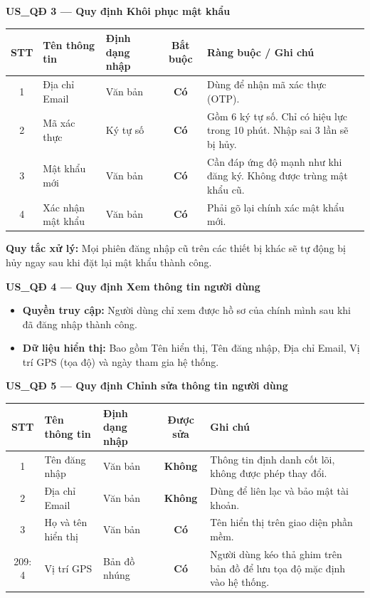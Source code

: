 \documentclass[12pt,a4paper]{article}
\begin{document}
\vspace{0.4cm}
\noindent\textbf{US\_QĐ 3 --- Quy định Khôi phục mật khẩu}
\begin{longtable}{|c|l|p{2.5cm}|c|p{5cm}|}
\hline
\rowcolor{headerblue}
\textbf{STT} & \textbf{Tên thông tin} & \textbf{Định dạng nhập} & \textbf{Bắt buộc} & \textbf{Ràng buộc / Ghi chú} \\
\hline
\endhead
1 & Địa chỉ Email & Văn bản & \textbf{Có} & Dùng để nhận mã xác thực (OTP). \\
\hline
2 & Mã xác thực & Ký tự số & \textbf{Có} & Gồm 6 ký tự số. Chỉ có hiệu lực trong 10 phút. Nhập sai 3 lần sẽ bị hủy. \\
\hline
3 & Mật khẩu mới & Văn bản & \textbf{Có} & Cần đáp ứng độ mạnh như khi đăng ký. Không được trùng mật khẩu cũ. \\
\hline
4 & Xác nhận mật khẩu & Văn bản & \textbf{Có} & Phải gõ lại chính xác mật khẩu mới. \\
\hline
\end{longtable}
\noindent\textbf{Quy tắc xử lý:} Mọi phiên đăng nhập cũ trên các thiết bị khác sẽ tự động bị hủy ngay sau khi đặt lại mật khẩu thành công.

\vspace{0.4cm}
\noindent\textbf{US\_QĐ 4 --- Quy định Xem thông tin người dùng}
\begin{itemize}
    \item \textbf{Quyền truy cập:} Người dùng chỉ xem được hồ sơ của chính mình sau khi đã đăng nhập thành công.
    \item \textbf{Dữ liệu hiển thị:} Bao gồm Tên hiển thị, Tên đăng nhập, Địa chỉ Email, Vị trí GPS (tọa độ) và ngày tham gia hệ thống.
\end{itemize}

\vspace{0.4cm}
\noindent\textbf{US\_QĐ 5 --- Quy định Chỉnh sửa thông tin người dùng}
\begin{longtable}{|c|l|p{2.5cm}|c|p{5cm}|}
\hline
\rowcolor{headerblue}
\textbf{STT} & \textbf{Tên thông tin} & \textbf{Định dạng nhập} & \textbf{Được sửa} & \textbf{Ghi chú} \\
\hline
\endhead
1 & Tên đăng nhập & Văn bản & \textbf{Không} & Thông tin định danh cốt lõi, không được phép thay đổi. \\
\hline
2 & Địa chỉ Email & Văn bản & \textbf{Không} & Dùng để liên lạc và bảo mật tài khoản. \\
\hline
3 & Họ và tên hiển thị & Văn bản & \textbf{Có} & Tên hiển thị trên giao diện phần mềm. \\
\hline
209: 4 & Vị trí GPS & Bản đồ nhúng & \textbf{Có} & Người dùng kéo thả ghim trên bản đồ để lưu tọa độ mặc định vào hệ thống. \\
\hline
\end{longtable}
\end{document}
